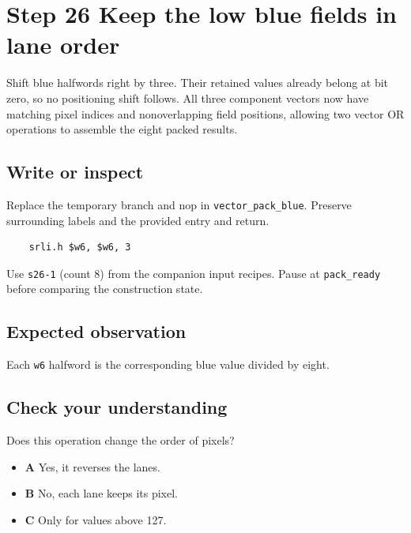 \section{Step 26 Keep the low blue fields in lane order}\label{rgb-s26}

Shift blue halfwords right by three. Their retained values already belong at bit zero, so no positioning shift follows. All three component vectors now have matching pixel indices and nonoverlapping field positions, allowing two vector OR operations to assemble the eight packed results.

\subsection{Write or inspect}
Replace the temporary branch and nop in \texttt{vector\_pack\_blue}. Preserve surrounding labels and the provided entry and return.

\begin{verbatim}
    srli.h $w6, $w6, 3
\end{verbatim}
Use \texttt{s26-1} (count 8) from the companion input recipes. Pause at \texttt{pack\_ready} before comparing the construction state.

\subsection{Expected observation}
Each \texttt{w6} halfword is the corresponding blue value divided by eight.

\subsection{Check your understanding}
Does this operation change the order of pixels?

\begin{itemize}
  \item \textbf{A} Yes, it reverses the lanes.
  \item \textbf{B} No, each lane keeps its pixel.
  \item \textbf{C} Only for values above 127.
\end{itemize}
